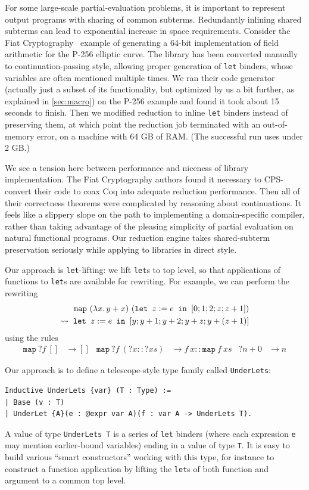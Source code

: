 For some large-scale partial-evaluation problems, it is important to represent output programs with sharing of common subterms.
Redundantly inlining shared subterms can lead to exponential increase in space requirements.
Consider the Fiat Cryptography~\cite{FiatCryptoSP19} example of generating a 64-bit implementation of field arithmetic for the P-256 elliptic curve.
The library has been converted manually to continuation-passing style, allowing proper generation of \texttt{let} binders, whose variables are often mentioned multiple times.
We ran their code generator (actually just a subset of its functionality, but optimized by us a bit further, as explained in \autoref{sec:macro}) on the P-256 example and found it took about 15 seconds to finish.
Then we modified reduction to inline \texttt{let} binders instead of preserving them, at which point the reduction job terminated with an out-of-memory error, on a machine with 64 GB of RAM.
(The successful run uses under 2 GB.)

We see a tension here between performance and niceness of library implementation.
The Fiat Cryptography authors found it necessary to CPS-convert their code to coax Coq into adequate reduction performance.
Then all of their correctness theorems were complicated by reasoning about continuations.
It feels like a slippery slope on the path to implementing a domain-specific compiler, rather than taking advantage of the pleasing simplicity of partial evaluation on natural functional programs.
Our reduction engine takes shared-subterm preservation seriously while applying to libraries in direct style.

Our approach is \texttt{let}-lifting: we lift \texttt{let}s to top level, so that applications of functions to \texttt{let}s are available for rewriting.
For example, we can perform the rewriting
\begin{align*}
  \texttt{map}\ (\lambda x.\, y+x)\ (\letin[{z:=e}{[0;1;2;z;z+1]}]) \\
  \leadsto \; \letin[{z:=e}{[y;y+1;y+2;y+z;y+(z+1)]}]
\end{align*}
using the rules
\begin{align*}
  \texttt{map}\ {?f}\ [] & \to []
  &
  \texttt{map}\ {?f}\ ({?x} :: {?xs}) & \to f\ x :: \texttt{map}\ f\ xs
  & {?n} + 0 & \to n %
\end{align*}

Our approach is to define a telescope-style type family called \texttt{UnderLets}:
\begin{verbatim}
Inductive UnderLets {var} (T : Type) :=
| Base (v : T)
| UnderLet {A}(e : @expr var A)(f : var A -> UnderLets T).
\end{verbatim}
A value of type \texttt{UnderLets T} is a series of \texttt{let} binders (where each expression \texttt{e} may mention earlier-bound variables) ending in a value of type \texttt{T}.
It is easy to build various ``smart constructors'' working with this type, for instance to construct a function application by lifting the \texttt{let}s of both function and argument to a common top level.

